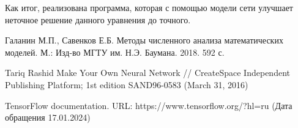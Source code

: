 \documentclass[12pt, a4paper]{article}
\begin{document}
Как итог, реализована программа, которая с помощью модели сети улучшает неточное решение данного уравнения до точного.  



\clearpage
\begin{thebibliography}{1}

 Галанин М.П., Савенков Е.Б. Методы численного анализа математических моделей. М.: Изд-во МГТУ им. Н.Э. Баумана. 2018. 592 с.


 Tariq Rashid Make Your Own Neural Network // CreateSpace Independent Publishing Platform; 1st edition SAND96-0583 (March 31, 2016)


 TensorFlow documentation. URL: https://www.tensorflow.org/?hl=ru (Дата обращения 17.01.2024)




\end{thebibliography}
\end{document}
